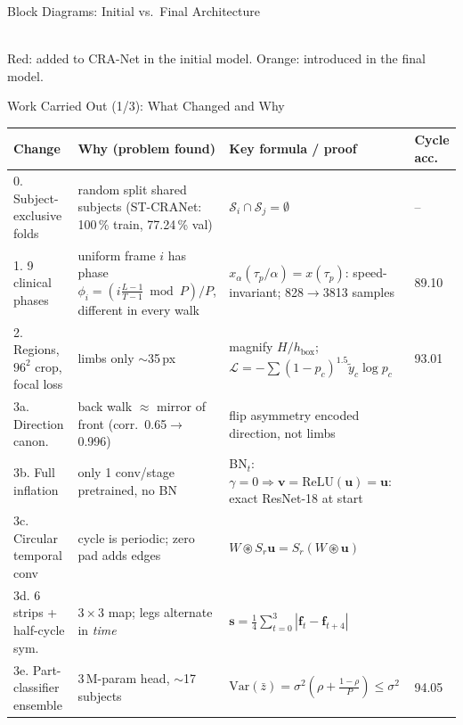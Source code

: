 \documentclass[aspectratio=169,10pt]{beamer}
\begin{document}
\begin{frame}{Block Diagrams: Initial vs.\ Final Architecture}
{}
\\[1mm]
\scriptsize Red: added to CRA-Net in the initial model. Orange: introduced in the final model.
\end{frame}

\begin{frame}{Work Carried Out (1/3): What Changed and Why}
\scriptsize
\begin{tabular}{@{}p{2.6cm}p{5.4cm}p{5.0cm}l@{}}
\toprule
Change & Why (problem found) & Key formula / proof & Cycle acc. \\
\midrule
0. Subject-exclusive folds & random split shared subjects (ST-CRANet: 100\,\% train, 77.24\,\% val) & $\mathcal S_i\cap\mathcal S_j=\emptyset$ & -- \\
1. 9 clinical phases & uniform frame $i$ has phase $\phi_i=(i\frac{L-1}{T-1}\bmod P)/P$, different in every walk & $x_\alpha(\tau_p/\alpha)=x(\tau_p)$: speed-invariant; 828$\rightarrow$3813 samples & 89.10 \\
2. Regions, $96^2$ crop, focal loss & limbs only $\sim$35\,px & magnify $H/h_{\text{box}}$; $\mathcal L=-\sum(1-p_c)^{1.5}\tilde y_c\log p_c$ & 93.01 \\
3a. Direction canon. & back walk $\approx$ mirror of front (corr.\ 0.65$\rightarrow$0.996) & flip asymmetry encoded direction, not limbs & \\
3b. Full inflation & only 1 conv/stage pretrained, no BN & BN$_t$: $\gamma{=}0\Rightarrow\mathbf v{=}\mathrm{ReLU}(\mathbf u){=}\mathbf u$: exact ResNet-18 at start & \\
3c. Circular temporal conv & cycle is periodic; zero pad adds edges & $W\circledast S_r\mathbf u=S_r(W\circledast\mathbf u)$ & \\
3d. 6 strips + half-cycle sym. & $3{\times}3$ map; legs alternate in \emph{time} & $\mathbf s=\frac14\sum_{t=0}^{3}|\mathbf f_t-\mathbf f_{t+4}|$ & \\
3e. Part-classifier ensemble & 3\,M-param head, $\sim$17 subjects & $\mathrm{Var}(\bar z)=\sigma^2(\rho+\frac{1-\rho}{P})\le\sigma^2$ & 94.05 \\
\bottomrule
\end{tabular}
\end{frame}
\end{document}

